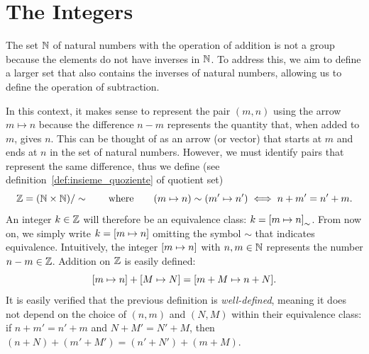 \section{The Integers}

The set ${\mathbb N}$ of natural numbers with the operation of addition is not a group
because the elements do not have inverses in ${\mathbb N}$. To address this, we aim to
define a larger set that also contains the inverses of natural numbers, allowing
us to define the operation of subtraction.

In this context, it makes sense to represent the pair $(m,n)$ using the arrow
$m\mapsto n$ because the difference $n-m$ represents the quantity that, when
added to $m$, gives $n$. This can be thought of as an arrow (or vector) that
starts at $m$ and ends at $n$ in the set of natural numbers. However, we must
identify pairs that represent the same difference, thus we define (see
definition~\ref{def:insieme_quoziente} of quotient set)
\[
  {\mathbb Z} = ({\mathbb N} \times {\mathbb N})/\sim
  \qquad\text{where}\qquad
  (m\mapsto n)\sim (m' \mapsto n')\iff n+m' = n'+m.
\]
An integer $k\in {\mathbb Z}$ will therefore be an equivalence class: $k = {\left[ m
\mapsto n \right]}_\sim$.
From now on, we simply write $k={\left[ m\mapsto n \right]}$ omitting the symbol $\sim$
that indicates equivalence. Intuitively, the integer ${\left[ m\mapsto n \right]}$ with
$n,m\in {\mathbb N}$ represents the number $n-m\in {\mathbb Z}$. Addition on ${\mathbb Z}$ is easily
defined:
\[
 {\left[ m \mapsto n \right]}+{\left[ M\mapsto N \right]} = {\left[ m+M \mapsto n+N \right]}.
\]
%
It is easily verified that the previous definition is \emph{well-defined},
meaning it does not depend on the choice of $(n,m)$ and $(N,M)$ within their
equivalence class: if $n+m' = n'+m$ and $N+M'=N'+M$, then
$(n+N)+(m'+M')=(n'+N')+(m+M)$.

